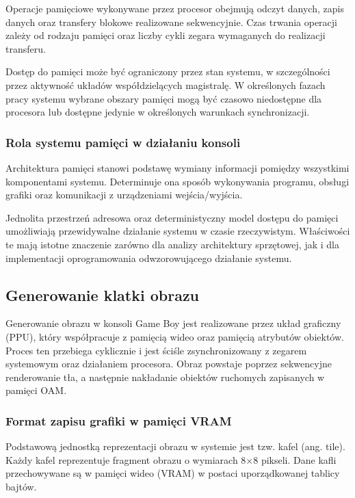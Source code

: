 \documentclass{article}
\begin{document}
Operacje pamięciowe wykonywane przez procesor obejmują odczyt danych, zapis danych oraz transfery blokowe realizowane sekwencyjnie. Czas trwania operacji zależy od rodzaju pamięci oraz liczby cykli zegara wymaganych do realizacji transferu.

Dostęp do pamięci może być ograniczony przez stan systemu, w szczególności przez aktywność układów współdzielących magistralę. W określonych fazach pracy systemu wybrane obszary pamięci mogą być czasowo niedostępne dla procesora lub dostępne jedynie w określonych warunkach synchronizacji.

\subsubsection{Rola systemu pamięci w działaniu konsoli}

Architektura pamięci stanowi podstawę wymiany informacji pomiędzy wszystkimi komponentami systemu. Determinuje ona sposób wykonywania programu, obsługi grafiki oraz komunikacji z urządzeniami wejścia/wyjścia.

Jednolita przestrzeń adresowa oraz deterministyczny model dostępu do pamięci umożliwiają przewidywalne działanie systemu w czasie rzeczywistym. Właściwości te mają istotne znaczenie zarówno dla analizy architektury sprzętowej, jak i dla implementacji oprogramowania odwzorowującego działanie systemu.
\subsection{Generowanie klatki obrazu}

Generowanie obrazu w konsoli Game Boy jest realizowane przez układ graficzny (PPU), który współpracuje z pamięcią wideo oraz pamięcią atrybutów obiektów. Proces ten przebiega cyklicznie i jest ściśle zsynchronizowany z zegarem systemowym oraz działaniem procesora. Obraz powstaje poprzez sekwencyjne renderowanie tła, a następnie nakładanie obiektów ruchomych zapisanych w pamięci OAM.

\subsubsection{Format zapisu grafiki w pamięci VRAM}

Podstawową jednostką reprezentacji obrazu w systemie jest tzw. kafel (ang. tile). Każdy kafel reprezentuje fragment obrazu o wymiarach 8×8 pikseli. Dane kafli przechowywane są w pamięci wideo (VRAM) w postaci uporządkowanej tablicy bajtów.
\end{document}

